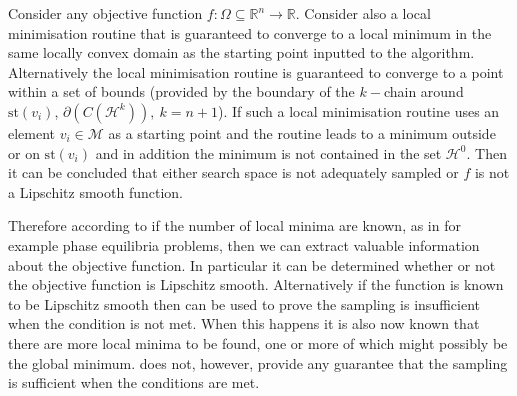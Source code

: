 \begin{corollary} \label{corollary:smooth}
Consider any objective function $f : \Omega \subseteq \mathbb{R}^n \rightarrow \mathbb{R}$. Consider also a local minimisation routine that is guaranteed to converge to a local minimum in the same locally convex domain as the starting point inputted to the algorithm. Alternatively the local minimisation routine is guaranteed to converge to a point within a set of bounds (provided by the boundary of the $k-$chain around $\textrm{st}\left( v_i \right)$,  $\partial \left( C(\mathcal{H}^k) \right), ~k = n + 1$). If such a local minimisation routine  uses an element $v_i \in \mathcal{M}$ as a starting point and the routine leads to a minimum outside or on $\textrm{st}\left(v_{i}\right)$ and in addition the minimum is not contained in the set $\mathcal{H}^0$. Then it can be concluded that either search space is not adequately sampled or $f$ is not a Lipschitz smooth function.
\end{corollary}
Therefore according to  if the number of local minima are known, as in for example phase equilibria problems, then we can extract valuable information about the objective function. In particular it can be determined whether or not the objective function is Lipschitz smooth. Alternatively if the function is known to be Lipschitz smooth then  can be used to prove the sampling is insufficient when the condition is not met. When this happens it is also now known that there are more local minima to be found, one or more of which might possibly be the global minimum.  does not, however, provide any guarantee that the sampling is sufficient when the conditions are met.
